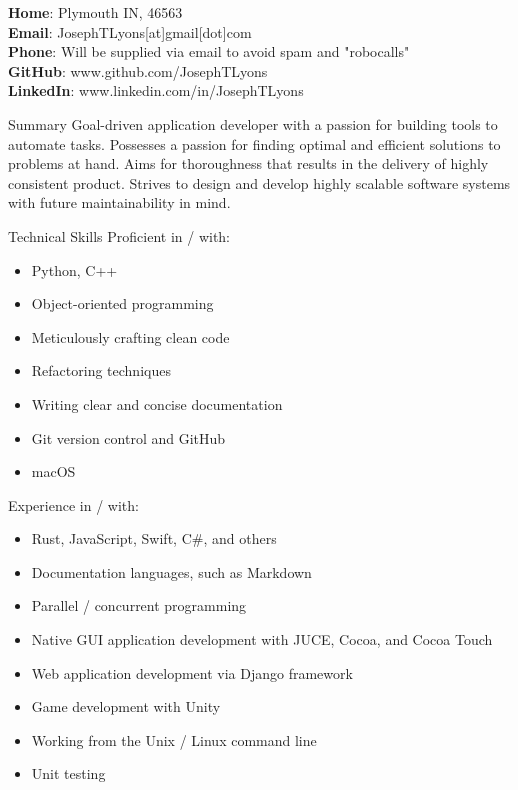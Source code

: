 \documentclass{Joseph_T_Lyons_Resume}
\newenvironment{tightlySpacedList}
{ \begin{itemize}
    \setlength{\itemsep}{0pt}
    \setlength{\parskip}{0pt}
    \setlength{\parsep}{0pt}     }
{ \end{itemize}                  }
\begin{document}
\textbf{Home}: Plymouth IN, 46563
\\\textbf{Email}: JosephTLyons[at]gmail[dot]com
\\\textbf{Phone}: Will be supplied via email to avoid spam and "robocalls"
\\\textbf{GitHub}: www.github.com/JosephTLyons
\\\textbf{LinkedIn}: www.linkedin.com/in/JosephTLyons

\begin{rSection}{Summary}
Goal-driven application developer with a passion for building tools to automate
tasks.  Possesses a passion for finding optimal and efficient solutions to
problems at hand.  Aims for thoroughness that results in the delivery of highly
consistent product.  Strives to design and develop highly scalable software
systems with future maintainability in mind.
\end{rSection}

\begin{rSection}{Technical Skills}
Proficient in / with:

\begin{tightlySpacedList}
    \item Python, C++
    \item Object-oriented programming
    \item Meticulously crafting clean code
    \item Refactoring techniques
    \item Writing clear and concise documentation
    \item Git version control and GitHub
    \item macOS
\end{tightlySpacedList}

Experience in / with:
\begin{tightlySpacedList}
    \item Rust, JavaScript, Swift, C\#, and others
    \item Documentation languages, such as Markdown
    \item Parallel / concurrent programming
    \item Native GUI application development with JUCE, Cocoa, and Cocoa Touch
    \item Web application development via Django framework
    \item Game development with Unity
    \item Working from the Unix / Linux command line
    \item Unit testing
\end{tightlySpacedList}
\end{rSection}
\end{document}
